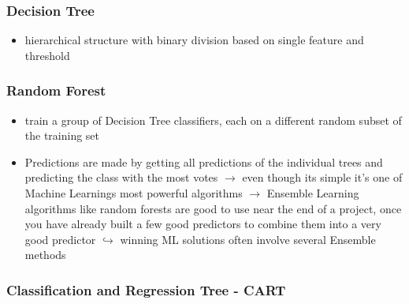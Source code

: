 \documentclass[12pt,a4paper]{article}
\begin{document}
\subsubsection{Decision Tree} %
\label{ssub:decision_tree}

\begin{itemize}
  \item hierarchical structure with binary division based on single feature and threshold
\end{itemize}

\subsubsection{Random Forest} %
\label{ssub:random_forest}

\begin{itemize}
  \item train a group of Decision Tree classifiers, each on a different random subset of the training set
  \item Predictions are made by getting all predictions of the individual trees and predicting the class with the most votes
  \newline \indent $\longrightarrow$ even though its simple it's one of Machine Learnings most powerful algorithms
  \newline \indent $\longrightarrow$  Ensemble Learning algorithms like random forests are good to use near the end of a project, once you have already built a few good predictors to combine them into a very good predictor
  \newline \indent $\hookrightarrow$ winning ML solutions often involve several Ensemble methods
\end{itemize}

\subsubsection{Classification and Regression Tree - CART} %
\label{ssub:classification_and_regression_tree_cart}
\end{document}
